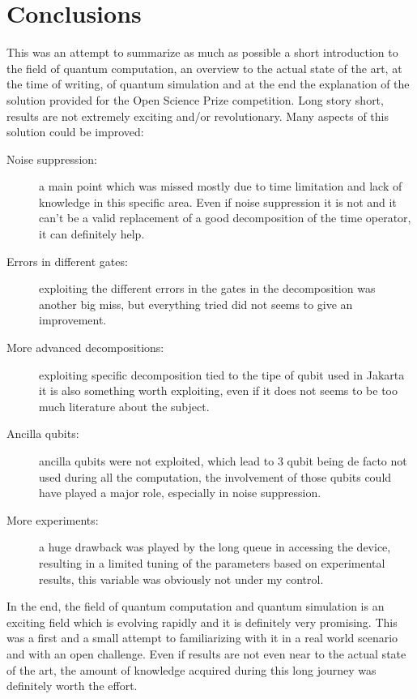 \chapter{Conclusions}

This was an attempt to summarize as much as possible a short introduction to the field of quantum computation, an overview to the actual state of the art, at the time of writing, of quantum simulation and at the end the explanation of the solution provided for the Open Science Prize competition.
Long story short, results are not extremely exciting and/or revolutionary. Many aspects of this solution could be improved:

\begin{description}
\item[Noise suppression: ]a main point which was missed mostly due to time limitation and lack of knowledge in this specific area. Even if noise suppression it is not and it can't be a valid replacement of a good decomposition of the time operator, it can definitely help.
\item[Errors in different gates: ] exploiting the different errors in the gates in the decomposition was another big miss, but everything tried did not seems to give an improvement.
\item[More advanced decompositions: ] exploiting specific decomposition tied to the tipe of qubit used in Jakarta it is also something worth exploiting, even if it does not seems to be too much literature about the subject.
\item[Ancilla qubits: ] ancilla qubits were not exploited, which lead to 3 qubit being de facto not used during all the computation, the involvement of those qubits could have played a major role, especially in noise suppression.
\item[More experiments: ] a huge drawback was played by the long queue in accessing the device, resulting in a limited tuning of the parameters based on experimental results, this variable was obviously not under my control.
\end{description}

In the end, the field of quantum computation and quantum simulation is an exciting field which is evolving rapidly and it is definitely very promising. This was a first and a small attempt to familiarizing with it in a real world scenario and with an open challenge. Even if results are not even near to the actual state of the art, the amount of knowledge acquired during this long journey was definitely worth the effort. 

